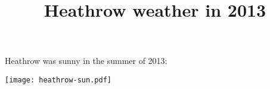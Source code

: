 \documentclass[a4paper]{article}
\title{Heathrow weather in 2013}
\begin{document}
\maketitle

Heathrow was sunny in the summer of 2013:

\texttt{[image: heathrow-sun.pdf]}
\end{document}
